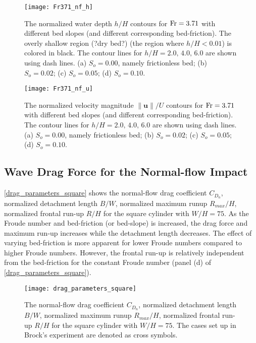 \documentclass{jfm}
\newcommand{\fr}{{\rm{Fr}}}
\begin{document}
\begin{figure}
	\centerline{\texttt{[image: Fr371\_nf\_h]}}
	\caption{The normalized water depth $h/H$ contours for $\fr=3.71$ with different bed slopes (and different corresponding bed-friction). The overly shallow region (?dry bed?) (the region where $h/H<0.01$) is colored in black. The contour lines for $h/H=2.0,\, 4.0,\, 6.0$ are shown using dash lines. (a) $S_o=0.00$, namely frictionless bed; (b) $S_o=0.02$; (c) $S_o=0.05$; (d) $S_o=0.10$.} 
	\label{Fr371_nf_h}
\end{figure}

\begin{figure}
	\centerline{\texttt{[image: Fr371\_nf\_u]}}
	\caption{The normalized velocity magnitude $\left\|{\pmb{u}}\right\|/U$ contours  for $\fr=3.71$ with different bed slopes (and different corresponding bed-friction). The contour lines for $h/H=2.0,\, 4.0,\, 6.0$ are shown using dash lines. (a) $S_o=0.00$, namely frictionless bed; (b) $S_o=0.02$; (c) $S_o=0.05$; (d) $S_o=0.10$.} 
	\label{Fr371_nf_u}
\end{figure}


\subsection{Wave Drag Force for the Normal-flow Impact}\label{NFW}
\autoref{drag_parameters_square} shows the normal-flow drag coefficient $C_{D_n}$, normalized detachment length $B/W$, normalized maximum runup $R_{max}/H$, normalized frontal run-up $R/H$ for the square cylinder with $W/H=75$. As the Froude number and bed-friction (or bed-slope)  is increased, the drag force and maximum run-up increases while the detachment length decreases.  The effect of varying bed-friction is more apparent for lower Froude numbers compared to higher Froude numbers. However, the frontal run-up is relatively independent from the bed-friction for the constant Froude number (panel (d) of \autoref{drag_parameters_square}).


\begin{figure}
	\centerline{\texttt{[image: drag\_parameters\_square]}}
	\caption{The normal-flow drag coefficient $C_{D_n}$, normalized detachment length $B/W$, normalized maximum runup $R_{max}/H$, normalized frontal run-up $R/H$ for the square cylinder with $W/H=75$. The cases set up in Brock's experiment are denoted as cross symbols.} 
	\label{drag_parameters_square}
\end{figure}
\end{document}
